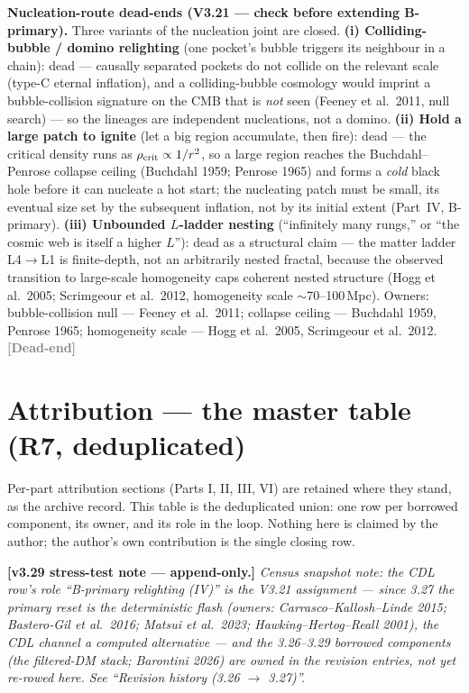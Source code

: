 \documentclass[11pt]{article}
\newcommand{\dead}{\textcolor{gray}{\textbf{[Dead-end]}}}
\begin{document}
\medskip\noindent\textbf{Nucleation-route dead-ends (V3.21 --- check before extending B-primary).} Three variants of the nucleation joint are closed. \textbf{(i) Colliding-bubble / domino relighting} (one pocket's bubble triggers its neighbour in a chain): dead --- causally separated pockets do not collide on the relevant scale (type-C eternal inflation), and a colliding-bubble cosmology would imprint a bubble-collision signature on the CMB that is \emph{not} seen (Feeney et al.\ 2011, null search) --- so the lineages are independent nucleations, not a domino. \textbf{(ii) Hold a large patch to ignite} (let a big region accumulate, then fire): dead --- the critical density runs as $\rho_{\rm crit}\propto1/r^2$, so a large region reaches the Buchdahl--Penrose collapse ceiling (Buchdahl 1959; Penrose 1965) and forms a \emph{cold} black hole before it can nucleate a hot start; the nucleating patch must be small, its eventual size set by the subsequent inflation, not by its initial extent (Part~IV, B-primary). \textbf{(iii) Unbounded $L$-ladder nesting} (``infinitely many rungs,'' or ``the cosmic web is itself a higher $L$''): dead as a structural claim --- the matter ladder L4$\to$L1 is finite-depth, not an arbitrarily nested fractal, because the observed transition to large-scale homogeneity caps coherent nested structure (Hogg et al.\ 2005; Scrimgeour et al.\ 2012, homogeneity scale $\sim$70--100\,Mpc). Owners: bubble-collision null --- Feeney et al.\ 2011; collapse ceiling --- Buchdahl 1959, Penrose 1965; homogeneity scale --- Hogg et al.\ 2005, Scrimgeour et al.\ 2012. \dead\quad

\clearpage

\part{Attribution --- the master table (R7, deduplicated)}
\setcounter{section}{0}\setcounter{equation}{0}\setcounter{figure}{0}

\noindent Per-part attribution sections (Parts I, II, III, VI) are retained where they stand, as the archive record. This table is the deduplicated union: one row per borrowed component, its owner, and its role in the loop. Nothing here is claimed by the author; the author's own contribution is the single closing row.

\smallskip\noindent\textbf{[v3.29 stress-test note --- append-only.]} \emph{Census snapshot note: the CDL row's role ``B-primary relighting (IV)'' is the V3.21 assignment --- since 3.27 the primary reset is the deterministic flash (owners: Carrasco--Kallosh--Linde 2015; Bastero-Gil et al.\ 2016; Matsui et al.\ 2023; Hawking--Hertog--Reall 2001), the CDL channel a computed alternative --- and the 3.26--3.29 borrowed components (the filtered-DM stack; Barontini 2026) are owned in the revision entries, not yet re-rowed here. See ``Revision history (3.26 $\to$ 3.27)''.}
\end{document}
